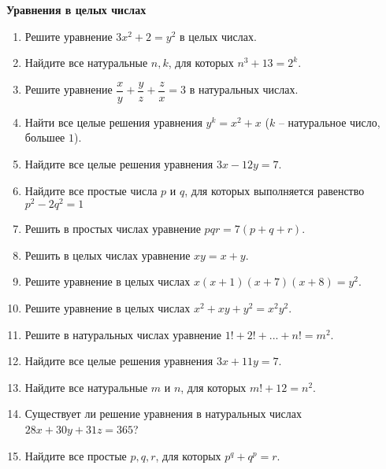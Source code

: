 \documentclass{article}
\begin{document}
\large
	
\begin{center}
	\textbf{Уравнения в целых числах}
\end{center}


\begin{enumerate}[label*=\protect\fbox{\arabic{enumi}}]
	
\item Решите уравнение $3x^2 + 2 = y^2$ в целых числах.
	
\item Найдите все натуральные $n, k$, для которых $n^3 + 13 = 2^k$.
	
\item Решите уравнение $\dfrac{x}{y} + \dfrac{y}{z} + \dfrac{z}{x} = 3$ в натуральных числах.

\item Найти все целые решения уравнения  $y^k = x^2 + x $ ($k$ – натуральное число, большее $1$).

\item Найдите все целые решения уравнения $3x - 12y = 7.$

\item Найдите все простые числа $p$ и $q$, для которых выполняется равенство  $p^2 - 2q^2 = 1$

\item Решить в простых числах уравнение  $pqr = 7(p + q + r).$  

\item Решить в целых числах уравнение  $xy = x + y.$

\item Решите уравнение в целых числах  $x(x+1)(x+7)(x+8) = y^2.$

\item Решите уравнение в целых числах  $x^2 + xy + y^2 = x^2y^2.$

\item Решите в натуральных числах уравнение   $1! + 2! + ... + n! = m^2$.

\item Найдите все целые решения уравнения $3x + 11y = 7.$

\item Найдите все натуральные $m$ и $n$, для которых $m! + 12 = n^2$.

\item Существует ли решение уравнения в натуральных числах $28x + 30y+ 31z = 365$?

\item Найдите все простые $p, q, r$, для которых $p^q + q^p = r$.


\end{enumerate}
\end{document}
